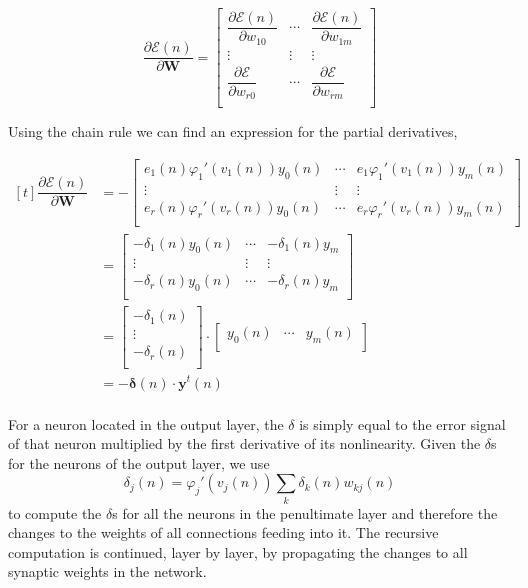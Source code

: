 \documentclass[twocolumn]{article}
\begin{document}
$$ \dfrac{\partial \mathcal{E} (n)}{\partial \boldsymbol{W}} =
\begin{bmatrix}
	\dfrac{\partial \mathcal{E} (n)}{\partial w_{10}} & \cdots & \dfrac{\partial \mathcal{E} (n)}{\partial w_{1m}} \\
	\vdots & \vdots & \vdots \\
	\dfrac{\partial \mathcal{E}}{\partial w_{r0}} & \cdots & \dfrac{\partial \mathcal{E}}{\partial w_{rm}} \\
\end{bmatrix}
$$

Using the chain rule we can find an expression for the partial derivatives,

$$ \begin{aligned}[t]
	\dfrac{\partial \mathcal{E} (n)}{\partial \boldsymbol{W}} &= -
\begin{bmatrix}
	e_{1} (n) \varphi_{1}' (v_{1} (n))y_{0} (n) & \cdots & e_{1}\varphi_{1}' (v_{1} (n))y_{m} (n) \\
	\vdots & \vdots & \vdots \\
	e_{r} (n) \varphi_{r}' (v_{r} (n))y_{0} (n) & \cdots & e_{r}\varphi_{r}' (v_{r} (n))y_{m} (n) \\ 
\end{bmatrix} \\
						     &=
\begin{bmatrix}
	-\delta_{1} (n) y_{0} (n) & \cdots & -\delta_{1} (n) y_{m} \\
	\vdots & \vdots & \vdots \\
	-\delta_{r} (n) y_{0} (n) & \cdots & -\delta_{r} (n) y_{m} \\
\end{bmatrix} \\
						     &=
\begin{bmatrix}
	-\delta_{1} (n) \\
	\vdots \\
	-\delta_{r} (n) \\
\end{bmatrix}
\cdot
\begin{bmatrix}
	y_{0} (n) & \cdots & y_{m} (n) \\
\end{bmatrix} \\
						     &= -\boldsymbol{\delta} (n) \cdot \boldsymbol{y}^{t} (n) \\
\end{aligned} $$

For a neuron located in the output layer, the $ \delta $ is simply equal to the error signal of that neuron multiplied by the first derivative of its nonlinearity. Given the $ \delta $s for the neurons of the output layer, we use $$ \delta_{j} (n) = \varphi_{j}' (v_{j} (n)) \sum_{k} \delta_{k} (n) w_{kj} (n) $$ to compute the $ \delta $s for all the neurons in the penultimate layer and therefore the changes to the weights of all connections feeding into it. The recursive computation is continued, layer by layer, by propagating the changes to all synaptic weights in the network.
\end{document}
